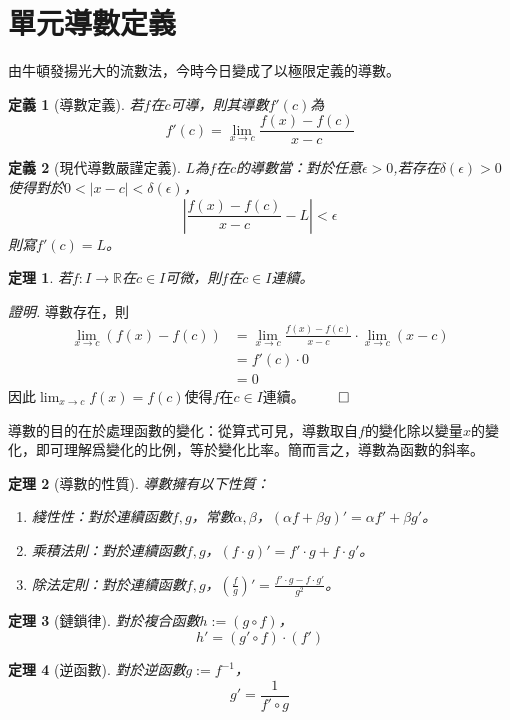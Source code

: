 \documentclass[12pt]{article}
\newtheorem{definition}{定義}
\newtheorem*{theorem}{定理}
\renewenvironment*{proof}{\textit{證明.}}{\hfill$\qed$}
\begin{document}
    \section*{單元導數定義}

    由牛頓發揚光大的流數法，今時今日變成了以極限定義的導數。

    \begin{definition}[導數定義]
        若$f$在$c$可導，則其導數$f'(c)$為$$f'(c)=\lim_{x\to c}\frac{f(x)-f(c)}{x-c}$$
    \end{definition}

    \begin{definition}[現代導數嚴謹定義]
        $L$為$f$在$c$的導數當：對於任意$\epsilon>0$,若存在$\delta(\epsilon)>0$使得對於$0<|x-c|<\delta(\epsilon)$，$$|\frac{f(x)-f(c)}{x-c}-L|<\epsilon$$
        則寫$f'(c)=L$。
    \end{definition}

    \begin{theorem}
        若$f:I\to\mathbb{R}$在$c\in I$可微，則$f$在$c\in I$連續。
    \end{theorem}

    \begin{proof}
        導數存在，則\begin{align*}
            \lim_{x\to c}(f(x)-f(c))&=\lim_{x\to c}\frac{f(x)-f(c)}{x-c}\cdot \lim_{x\to c}(x-c)\\
            &=f'(c)\cdot 0\\
            &=0
        \end{align*}
        因此$\displaystyle\lim_{x\to c}f(x)=f(c)$使得$f$在$c\in I$連續。
    \end{proof}

    導數的目的在於處理函數的變化：從算式可見，導數取自$f$的變化除以變量$x$的變化，即可理解爲變化的比例，等於變化比率。簡而言之，導數為函數的斜率。

    \begin{theorem}[導數的性質]
        導數擁有以下性質：\begin{enumerate}
            \item 綫性性：對於連續函數$f,g$，常數$\alpha,\beta$，$(\alpha f+\beta g)'=\alpha f' + \beta g'$。
            \item 乘積法則：對於連續函數$f,g$，$(f\cdot g)'=f'\cdot g + f\cdot g'$。
            \item 除法定則：對於連續函數$f,g$，$(\frac{f}{g})'=\frac{f'\cdot g-f\cdot g'}{g^2}$。
        \end{enumerate}
    \end{theorem}

    \begin{theorem}[鏈鎖律]
        對於複合函數$h:=(g\circ f)$，$$h'=(g'\circ f)\cdot(f')$$
    \end{theorem}

    \begin{theorem}[逆函數]
        對於逆函數$g:=f^{-1}$，$$g'=\frac{1}{f'\circ g}$$
    \end{theorem}
\end{document}
